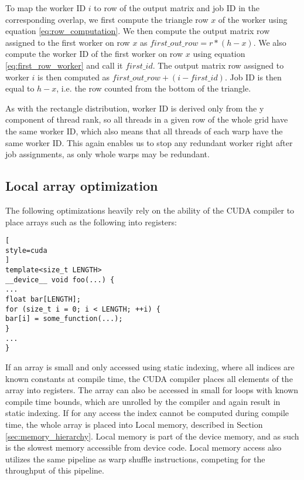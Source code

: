 To map the worker ID $i$ to row of the output matrix and job ID in the corresponding overlap, we first compute the triangle row $x$ of the worker using equation \ref{eq:row_computation}. We then compute the output matrix row assigned to the first worker on row $x$ as $first\_out\_row = r * (h - x)$. We also compute the worker ID of the first worker on row $x$ using equation \ref{eq:first_row_worker} and call it $first\_id$. The output matrix row assigned to worker $i$ is then computed as $first\_out\_row + (i - first\_id)$. Job ID is then equal to $h - x$, i.e. the row counted from the bottom of the triangle.

As with the rectangle distribution, worker ID is derived only from the y component of thread rank, so all threads in a given row of the whole grid have the same worker ID, which also means that all threads of each warp have the same worker ID. This again enables us to stop any redundant worker right after job assignments, as only whole warps may be redundant.


\subsection{Local array optimization}
\label{sec:local_array_optimization}

The following optimizations heavily rely on the ability of the CUDA compiler to place arrays such as the following into registers:

\begin{lstlisting}[
style=cuda
]
template<size_t LENGTH>
__device__ void foo(...) {
...
float bar[LENGTH];
for (size_t i = 0; i < LENGTH; ++i) {
bar[i] = some_function(...);
}
...
}
\end{lstlisting}

If an array is small and only accessed using static indexing, where all indices are known constants at compile time, the CUDA compiler places all elements of the array into registers. The array can also be accessed in small for loops with known compile time bounds, which are unrolled by the compiler and again result in static indexing. If for any access the index cannot be computed during compile time, the whole array is placed into Local memory, described in Section \ref{sec:memory_hierarchy}. Local memory is part of the device memory, and as such is the slowest memory accessible from device code. Local memory access also utilizes the same pipeline as warp shuffle instructions, competing for the throughput of this pipeline. 


